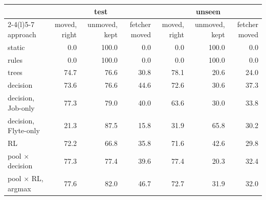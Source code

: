\begin{tabular}{@{}lrrrrrr@{}}
\toprule
& \multicolumn{3}{c}{test} & \multicolumn{3}{c}{unseen} \\
\cmidrule(lr){2-4}\cmidrule(l){5-7}
approach & moved, right & unmoved, kept & fetcher moved & moved, right & unmoved, kept & fetcher moved \\
\midrule
static & 0.0 & 100.0 & 0.0 & 0.0 & 100.0 & 0.0 \\
rules & 0.0 & 100.0 & 0.0 & 0.0 & 100.0 & 0.0 \\
trees & 74.7 & 76.6 & 30.8 & 78.1 & 20.6 & 24.0 \\
decision & 73.6 & 76.6 & 44.6 & 72.6 & 30.6 & 37.3 \\
decision, Job-only & 77.3 & 79.0 & 40.0 & 63.6 & 30.0 & 33.8 \\
decision, Flyte-only & 21.3 & 87.5 & 15.8 & 31.9 & 65.8 & 30.2 \\
RL & 72.2 & 66.8 & 35.8 & 71.6 & 42.6 & 29.8 \\
pool $\times$ decision & 77.3 & 77.4 & 39.6 & 77.4 & 20.3 & 32.4 \\
pool $\times$ RL, argmax & 77.6 & 82.0 & 46.7 & 72.7 & 31.9 & 32.0 \\
\bottomrule
\end{tabular}
